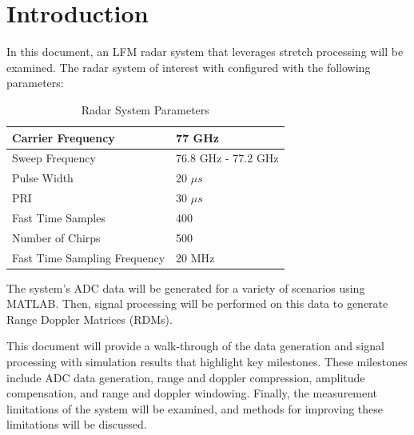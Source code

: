 \documentclass[conference]{IEEEtran}
\begin{document}
\section{Introduction}
In this document, an LFM radar system that leverages stretch processing will be examined. The radar system of interest with configured with the following parameters:
\begin{table}[H]
\caption{Radar System Parameters}
\label{Parameter Table}
\begin{tabularx}{0.5\textwidth}{| X | X |}
\hline
Carrier Frequency & 77 GHz \\
\hline
Sweep Frequency & 76.8 GHz - 77.2 GHz \\
\hline
Pulse Width & 20 $\mu s$ \\
\hline
PRI & 30 $\mu s$ \\
\hline
Fast Time Samples & 400 \\
\hline 
Number of Chirps & 500 \\
\hline
Fast Time Sampling Frequency & 20 MHz \\
\hline
\end{tabularx}
\end{table}
\noindent
The system's ADC data will be generated for a variety of scenarios using MATLAB. Then, signal processing will be performed on this data to generate Range Doppler Matrices (RDMs).
\par
This document will provide a walk-through of the data generation and signal processing with simulation results that highlight key milestones. These milestones include ADC data generation, range and doppler compression, amplitude compensation, and range and doppler windowing. Finally, the measurement limitations of the system will be examined, and methods for improving these limitations will be discussed.
\end{document}
